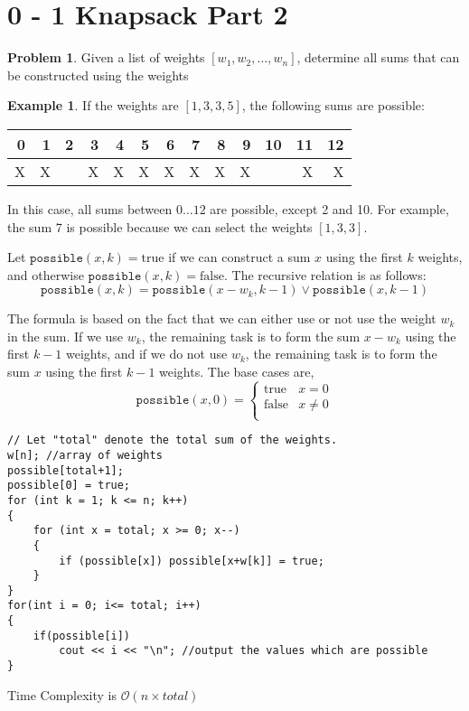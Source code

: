 \documentclass[twoside,12pt,a4paper,english]{book}
\theoremstyle{definition}
\newtheorem*{exmp}{Example}
\theoremstyle{problemstyle}
\newtheorem*{problem}{Problem} %
\theoremstyle{problemstyle}
\theoremstyle{problemstyle}
\begin{document}
\section{0 - 1 Knapsack Part 2}
\begin{problem}
Given a list of weights $[w_1,w_2,\ldots,w_n]$, determine all sums that can be constructed using the weights
\end{problem}
\begin{exmp}
If the weights are
$[1,3,3,5]$, the following sums are possible:

\begin{center}
\begin{tabular}{rrrrrrrrrrrrr}
 0 & 1 & 2 & 3 & 4 & 5 & 6 & 7 & 8 & 9 & 10 & 11 & 12 \\
\hline
 X & X & & X & X & X & X & X & X & X & & X & X \\
\end{tabular}
\end{center}

In this case, all sums between $0 \ldots 12$
are possible, except 2 and 10.
For example, the sum 7 is possible because we
can select the weights $[1,3,3]$.
\end{exmp}
\begin{tcolorbox}[title=Solution]

Let $\texttt{possible}(x,k)=\textrm{true}$ if
we can construct a sum $x$
using the first $k$ weights,
and otherwise $\texttt{possible}(x,k)=\textrm{false}$.
The recursive relation is as follows:
\[ \texttt{possible}(x,k) = \texttt{possible}(x-w_k,k-1) \lor \texttt{possible}(x,k-1) \]

The formula is based on the fact that we can
either use or not use the weight $w_k$ in the sum.
If we use $w_k$, the remaining task is to
form the sum $x-w_k$ using the first $k-1$ weights,
and if we do not use $w_k$,
the remaining task is to form the sum $x$
using the first $k-1$ weights.
The base cases are,
\begin{equation*}
    \texttt{possible}(x,0) = \begin{cases}
               \textrm{true}    & x = 0\\
               \textrm{false}   & x \neq 0 \\
           \end{cases}
\end{equation*}
\begin{lstlisting}
// Let "total" denote the total sum of the weights.
w[n]; //array of weights
possible[total+1];
possible[0] = true;
for (int k = 1; k <= n; k++)
{
    for (int x = total; x >= 0; x--)
    {
        if (possible[x]) possible[x+w[k]] = true;
    }
}
for(int i = 0; i<= total; i++)
{
    if(possible[i])
        cout << i << "\n"; //output the values which are possible
}
\end{lstlisting}
Time Complexity is $\mathcal{O}(n \times total)$
\end{tcolorbox}
\end{document}
